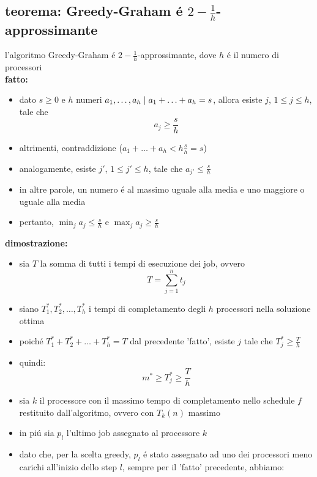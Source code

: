 \subsection*{teorema: Greedy-Graham \'e $2-\frac{1}{h}$-approssimante}
\begin{flushleft}
	l'algoritmo Greedy-Graham \'e $2-\frac{1}{h}$-approssimante, dove $h$ \'e il numero di processori \newline \\
	\vspace{0.5cm}
	\textbf{fatto:}
	\begin{itemize}
		\item dato $s\geq 0$ e $h$ numeri $a_1,\ldots,a_h\hspace{0.1cm}\vert\hspace{0.1cm}a_1+\ldots+a_h=s$, allora esiste $j$, $1\leq j\leq h$, tale che \newline
			$$a_j\geq\frac{s}{h}$$
		\item altrimenti, contraddizione ($a_1+\ldots+a_h<h\frac{s}{h}=s$)
		\item analogamente, esiste $j'$, $1\leq j'\leq h$, tale che $a_{j'}\leq\frac{s}{h}$
		\item in altre parole, un numero \'e al massimo uguale alla media e uno maggiore o uguale alla media
		\item pertanto, $\min_j a_j\leq\frac{s}{h}$ e $\max_j a_j\geq\frac{s}{h}$
	\end{itemize}
	\vspace{0.5cm}
	\textbf{dimostrazione:}
	\begin{itemize}
		\item sia $T$ la somma di tutti i tempi di esecuzione dei job, ovvero
			$$T=\sum_{j=1}^n t_j$$
		\item siano $T_1^*,T_2^*,\ldots,T_h^*$ i tempi di completamento degli $h$ processori nella soluzione ottima
		\item poich\'e $T_1^*+T_2^*+\ldots+T_h^*=T$ dal precedente 'fatto', esiste $j$ tale che $T_j^*\geq\frac{T}{h}$
		\item quindi:
			$$m^*\geq T_j^*\geq\frac{T}{h}$$
		\item sia $k$ il processore con il massimo tempo di completamento nello schedule $f$ restituito dall'algoritmo, ovvero con $T_k(n)$ massimo
		\item in pi\'u sia $p_l$ l'ultimo job assegnato al processore $k$
		\item dato che, per la scelta greedy, $p_l$ \'e stato assegnato ad uno dei processori meno carichi all'inizio dello step $l$, sempre per il 'fatto' precedente, abbiamo:

\end{itemize}
\end{flushleft}
